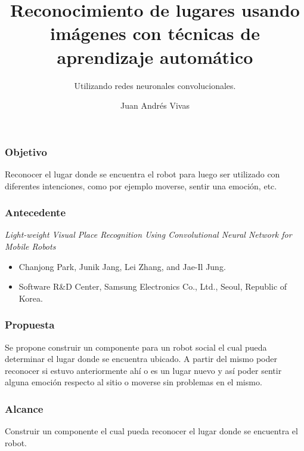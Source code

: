 \documentclass[12pt]{beamer}
\begin{document}
  \author{Juan Andr\'es Vivas}
  \title{Reconocimiento de lugares usando imágenes con técnicas de aprendizaje automático}
  \subtitle{Utilizando redes neuronales convolucionales.}
  \begin{frame}[plain]
  \maketitle
\end{frame}

\begin{frame}
\frametitle{Objetivo}

Reconocer el lugar donde se encuentra el robot para luego ser utilizado con diferentes intenciones, como por ejemplo moverse, sentir una emoción, etc.

\end{frame}


\begin{frame}
\frametitle{Antecedente}

\textit{Light-weight Visual Place Recognition Using Convolutional Neural Network for Mobile Robots}

\begin{itemize}
	\item Chanjong Park, Junik Jang, Lei Zhang, and Jae-Il Jung.
	\item Software R\&D Center, Samsung Electronics Co., Ltd., Seoul, Republic of Korea.
	
\end{itemize}

\end{frame}

\begin{frame}
\frametitle{Propuesta }

Se propone construir un componente para un robot social el cual pueda determinar el lugar donde se encuentra ubicado. A partir del mismo poder reconocer si estuvo anteriormente ahí o es un lugar nuevo y así poder sentir alguna emoción respecto al sitio o moverse sin problemas en el mismo.

\end{frame}


\begin{frame}
\frametitle{Alcance }

Construir un componente el cual pueda reconocer el lugar donde se encuentra el robot.


\end{frame}
\end{document}
